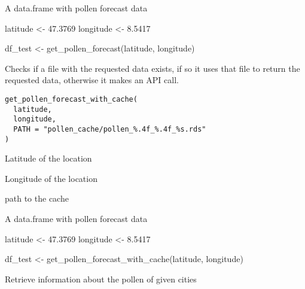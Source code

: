 \documentclass[letterpaper]{book}
\begin{document}
%
\begin{Value}
A data.frame with pollen forecast data
\end{Value}
%
\begin{Examples}
\begin{ExampleCode}
latitude <- 47.3769
longitude <- 8.5417

df_test <- get_pollen_forecast(latitude, longitude)

\end{ExampleCode}
\end{Examples}
%
\begin{Description}
Checks if a file with the requested data exists, if so it uses that file to return the requested data,
otherwise it makes an API call.
\end{Description}
%
\begin{Usage}
\begin{verbatim}
get_pollen_forecast_with_cache(
  latitude,
  longitude,
  PATH = "pollen_cache/pollen_%.4f_%.4f_%s.rds"
)
\end{verbatim}
\end{Usage}
%
\begin{Arguments}
\begin{ldescription}
\item[\code{latitude}] Latitude of the location

\item[\code{longitude}] Longitude of the location

\item[\code{PATH}] path to the cache
\end{ldescription}
\end{Arguments}
%
\begin{Value}
A data.frame with pollen forecast data
\end{Value}
%
\begin{Examples}
\begin{ExampleCode}
latitude <- 47.3769
longitude <- 8.5417

df_test <- get_pollen_forecast_with_cache(latitude, longitude)

\end{ExampleCode}
\end{Examples}
%
\begin{Description}
Retrieve information about the pollen of given cities
\end{Description}
\end{document}

